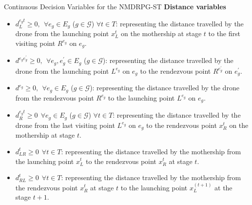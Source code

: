 \documentclass[slidestop,usepdftitle=false,10pt]{beamer}
\begin{document}
    \begin{frame}{Continuous Decision Variables for the NMDRPG-ST}
    \textbf{Distance variables}
    \begin{itemize}
        \small
        \item $d_L^{e_gt} \geq 0, \:\: \forall e_g \in E_g$ ($g \in \mathcal{G}$) $\forall t \in T$: representing the distance travelled by the drone from the launching point $x_L^t$ on the mothership at stage $t$ to the first visiting point $R^{e_g}$ on $e_g$.
        \item $d^{e_ge^\prime_g} \geq 0, \:\: \forall e_g, e^\prime_g \in E_g $ ($g \in \mathcal{G}$): representing the distance travelled by the drone from the launching
        point $L^{e_g}$ on $e_g$ to the rendezvous point $R^{e^\prime_g}$ on $e^\prime_g$.
        \item $d^{e_g} \geq 0, \:\: \forall e_g \in E_g$ ($g \in \mathcal{G}$): representing the distance travelled by the drone from the rendezvous point $R^{e_g}$ to the launching point $L^{e_g}$ on $e_g$. 
        \item $d_R^{e_gt} \geq 0 \:\: \forall e_g \in E_g$ ($g \in \mathcal{G}$) $\forall t \in T$: representing the distance travelled by the drone from the last
        visiting point $L^{e_g}$ on $e_g$ to the rendezvous point $x_R^t$ on the mothership at stage $t$.
        \item $d_{LR}^t \geq 0 \:\: \forall t \in T$: representing the distance travelled by the mothership from the launching point $x_L^t$ to the rendezvous point $x_R^t$ at stage $t$.
        \item $d_{RL}^t \geq 0 \:\: \forall t \in T$: representing the distance travelled by the mothership from the rendezvous point $x_R^t$ at stage $t$ to the launching point $x_L^{(t+1)}$ at the stage $t+1$.
    \end{itemize}
	\end{frame}
	
\end{document}
